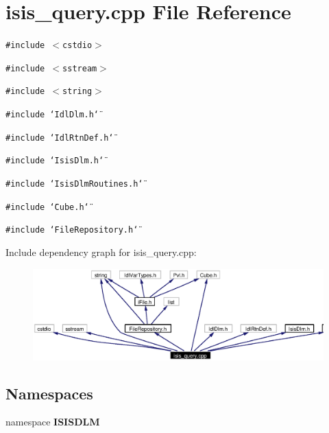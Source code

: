 \section{isis\_\-query.cpp File Reference}
\label{isis__query_8cpp}
{\tt \#include $<$cstdio$>$}\par
{\tt \#include $<$sstream$>$}\par
{\tt \#include $<$string$>$}\par
{\tt \#include \char`\"{}Idl\-Dlm.h\char`\"{}}\par
{\tt \#include \char`\"{}Idl\-Rtn\-Def.h\char`\"{}}\par
{\tt \#include \char`\"{}Isis\-Dlm.h\char`\"{}}\par
{\tt \#include \char`\"{}Isis\-Dlm\-Routines.h\char`\"{}}\par
{\tt \#include \char`\"{}Cube.h\char`\"{}}\par
{\tt \#include \char`\"{}File\-Repository.h\char`\"{}}\par


Include dependency graph for isis\_\-query.cpp:\begin{figure}[H]
\begin{center}
\leavevmode
\includegraphics[width=346pt]{isis__query_8cpp__incl}
\end{center}
\end{figure}
\subsection*{Namespaces}
\begin{CompactItemize}
\item 
namespace {\bf ISISDLM}
\end{CompactItemize}
